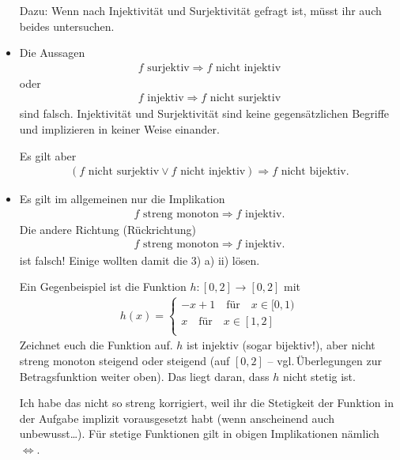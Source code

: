 \documentclass[11pt, a4paper]{article}
\begin{document}
\begin{itemize}
Dazu: Wenn nach Injektivität und Surjektivität gefragt ist, müsst ihr auch beides untersuchen.

\smiley{}

\item Die Aussagen
\begin{align*}
f \text{~surjektiv} \Rightarrow f \text{~nicht injektiv}
\end{align*}
oder 
\begin{align*}
f \text{~injektiv} \Rightarrow f \text{~nicht surjektiv}
\end{align*}
sind falsch. Injektivität und Surjektivität sind keine gegensätzlichen Begriffe und implizieren in keiner Weise einander.

Es gilt aber
\begin{align*}
\left(f \text{~nicht surjektiv} \lor f \text{~nicht injektiv}\right)   \Rightarrow f \text{~nicht bijektiv}.
\end{align*}

\item Es gilt im allgemeinen nur die Implikation 
\begin{align*}
f \text{~streng monoton} \Rightarrow f \text{~injektiv}.
\end{align*}
Die andere Richtung (Rückrichtung)
\begin{align*}
f \text{~streng monoton} \Rightarrow f \text{~injektiv}.
\end{align*}
ist falsch! Einige wollten damit die 3) a) ii) lösen. 

Ein Gegenbeispiel ist die Funktion $h \colon [0,2] \rightarrow [0,2]$ mit 
\begin{align*}
h(x) = \begin{cases}
-x+1 \quad  \text{für}\quad x \in [0,1)\\
x \quad \text{für} \quad  x \in [1,2]\\
\end{cases}
\end{align*}
Zeichnet euch die Funktion auf. $h$ ist injektiv (sogar bijektiv!), aber nicht streng monoton steigend oder steigend (auf $[0, 2]$ -- vgl.\,Überlegungen zur Betragsfunktion weiter oben). Das liegt daran, dass $h$ nicht stetig ist.

Ich habe das nicht so streng korrigiert, weil ihr die Stetigkeit der Funktion in der Aufgabe implizit vorausgesetzt habt (wenn anscheinend auch unbewusst\dots). Für stetige Funktionen gilt in obigen Implikationen nämlich $\Leftrightarrow$.

\end{itemize}
\end{document}
